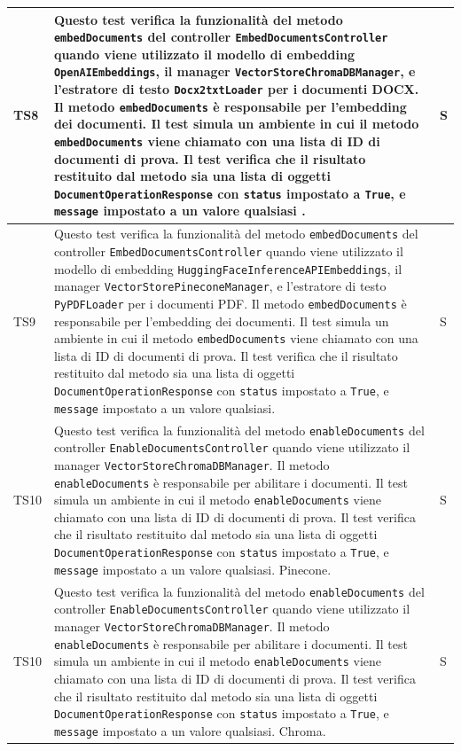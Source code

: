 \documentclass[10pt, a4paper]{article}
\begin{document}
\begin{xltabular}{\textwidth}{p{0.12\textwidth}|X|p{0.12\textwidth}}
    \hline
    TS8 & Questo test verifica la funzionalità del metodo \texttt{embedDocuments} del controller \texttt{EmbedDocumentsController} quando viene utilizzato il modello di embedding \texttt{OpenAIEmbeddings}, il manager \texttt{VectorStoreChromaDBManager}, e l'estratore di testo \texttt{Docx2txtLoader} per i documenti DOCX. Il metodo \texttt{embedDocuments} è responsabile per l'embedding dei documenti. Il test simula un ambiente in cui il metodo \texttt{embedDocuments} viene chiamato con una lista di ID di documenti di prova. Il test verifica che il risultato restituito dal metodo sia una lista di oggetti \texttt{DocumentOperationResponse} con \texttt{status} impostato a \texttt{True}, e \texttt{message} impostato a un valore qualsiasi .  & S \\
    \hline
    TS9 & Questo test verifica la funzionalità del metodo \texttt{embedDocuments} del controller \texttt{EmbedDocumentsController} quando viene utilizzato il modello di embedding \texttt{HuggingFaceInferenceAPIEmbeddings}, il manager \texttt{VectorStorePineconeManager}, e l'estratore di testo \texttt{PyPDFLoader} per i documenti PDF. Il metodo \texttt{embedDocuments} è responsabile per l'embedding dei documenti. Il test simula un ambiente in cui il metodo \texttt{embedDocuments} viene chiamato con una lista di ID di documenti di prova. Il test verifica che il risultato restituito dal metodo sia una lista di oggetti \texttt{DocumentOperationResponse} con \texttt{status} impostato a \texttt{True}, e \texttt{message} impostato a un valore qualsiasi.  & S \\
    \hline
    TS10 & Questo test verifica la funzionalità del metodo \texttt{enableDocuments} del controller \texttt{EnableDocumentsController} quando viene utilizzato il manager \texttt{VectorStoreChromaDBManager}. Il metodo \texttt{enableDocuments} è responsabile per abilitare i documenti. Il test simula un ambiente in cui il metodo \texttt{enableDocuments} viene chiamato con una lista di ID di documenti di prova. Il test verifica che il risultato restituito dal metodo sia una lista di oggetti \texttt{DocumentOperationResponse} con \texttt{status} impostato a \texttt{True}, e \texttt{message} impostato a un valore qualsiasi. Pinecone.  & S \\
    \hline
    TS10 & Questo test verifica la funzionalità del metodo \texttt{enableDocuments} del controller \texttt{EnableDocumentsController} quando viene utilizzato il manager \texttt{VectorStoreChromaDBManager}. Il metodo \texttt{enableDocuments} è responsabile per abilitare i documenti. Il test simula un ambiente in cui il metodo \texttt{enableDocuments} viene chiamato con una lista di ID di documenti di prova. Il test verifica che il risultato restituito dal metodo sia una lista di oggetti \texttt{DocumentOperationResponse} con \texttt{status} impostato a \texttt{True}, e \texttt{message} impostato a un valore qualsiasi. Chroma.  & S \\

\end{xltabular}
\end{document}
